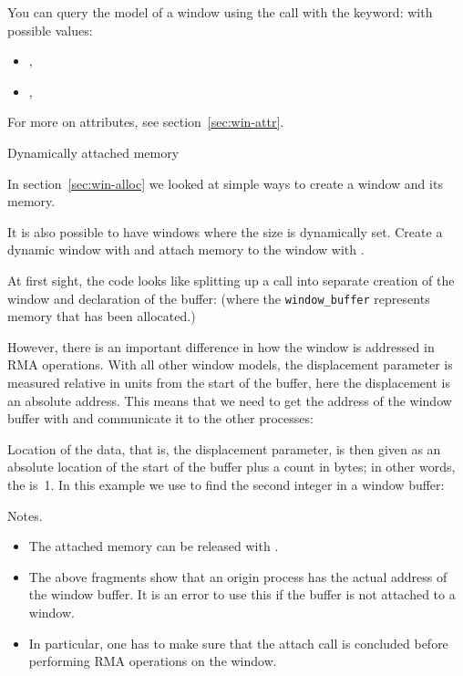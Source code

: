 You can query the model of a window
using the  call
with the  keyword:
%
%
with possible values:
\begin{itemize}
\item {},
\item {},
\end{itemize}
For more on attributes, see section~\ref{sec:win-attr}.

 {Dynamically attached memory}
\label{sec:win-dynamic}

In section~\ref{sec:win-alloc} we looked at simple ways to create a
window and its memory.

It is also possible to have windows where the size is dynamically set.
Create a dynamic window with
and attach
memory to the window with
%
.

At first sight, the code looks like splitting up a 
call into separate creation of the window and declaration of the buffer:
%
(where the \lstinline{window_buffer} represents memory that has been allocated.)

However, there is an important difference in how the window is addressed
in \ac{RMA} operations.
With all other window models, the displacement parameter is measured relative
in units from the start of the buffer, here the displacement
is an absolute address. This means that we need to get the address
of the window buffer with  and
communicate it to the other processes:
%

Location of the data, that is, the displacement parameter,
is then given as an absolute location
of the start of the buffer plus a count in bytes;
in other words, the  is~1.
In this example we use  to find the second
integer in a window buffer:
%

Notes.
\begin{itemize}
\item 
  The attached memory can be released with
  .
\item The above fragments show that an origin process has the actual
  address of the window buffer. It is an error to use this if the
  buffer is not attached to a window.
\item In particular, one has to make sure that the attach call is
  concluded before performing \ac{RMA} operations on the window.
\end{itemize}

